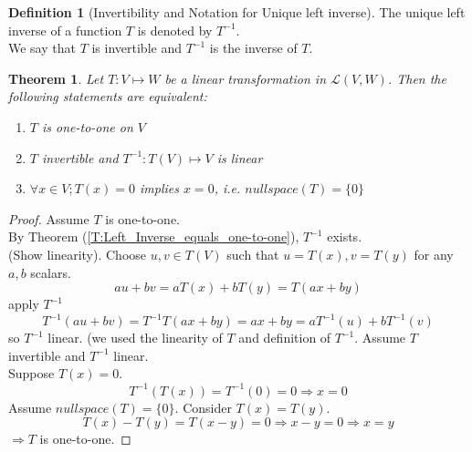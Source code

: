 \documentclass[twoside]{amsart}
\theoremstyle{plain}
\newtheorem{theorem}{Theorem}
\theoremstyle{definition}
\newtheorem{definition}{Definition}
\begin{document}
\begin{definition}[Invertibility and Notation for Unique left inverse]
  The unique left inverse of a function $T$ is denoted by $T^{-1}$.  \\
  We say that $T$ is invertible and $T^{-1}$ is the inverse of $T$.  
\end{definition}

\begin{theorem}
  Let $T:V \mapsto W$ be a linear transformation in $\mathcal{L}(V,W)$.  Then the following statements are equivalent:
  \begin{enumerate}
    \item $T$ is one-to-one on $V$ 
    \item $T$ invertible and $T^{-1}:T(V) \mapsto V$ is linear 
    \item $\forall x \in V; T(x) = 0$ implies $x=0$, i.e. $nullspace(T) = \{ 0 \}$ 
  \end{enumerate}
\end{theorem}
  \begin{proof}
    Assume $T$ is one-to-one. \\
    \phantom{Ass} By Theorem (\ref{T:Left_Inverse_equals_one-to-one}), $T^{-1}$ exists.  \\
    \phantom{Ass} (Show linearity).  Choose $u,v \in T(V)$ such that $u=T(x), v=T(y)$ for any $a,b$ scalars.  \\
    \[
    au + bv = aT(x) + bT(y) = T(ax+by) 
    \]
    \phantom{Ass} apply $T^{-1}$
    \[
    T^{-1}(au+bv) = T^{-1}T(ax+by) = ax + by = aT^{-1}(u) + bT^{-1}(v)
    \] 
    \phantom{Assume} so $T^{-1}$ linear.  (we used the linearity of $T$ and definition of $T^{-1}$. 
    Assume $T$ invertible and $T^{-1}$ linear.  \\
    \phantom{Ass} Suppose $T(x)= 0$.  
    \[
    T^{-1}(T(x)) = T^{-1}(0) = 0 \Longrightarrow x =0 
    \]
    Assume $nullspace(T) = \{ 0 \}$. 
    \phantom{Ass} Consider $T(x) = T(y)$.  
    \[
    T(x)-T(y) = T(x-y) =0 \Longrightarrow x-y = 0 \Longrightarrow x = y
    \]
    \phantom{assume} $\Longrightarrow T$ is one-to-one.  
  \end{proof}
\end{document}
